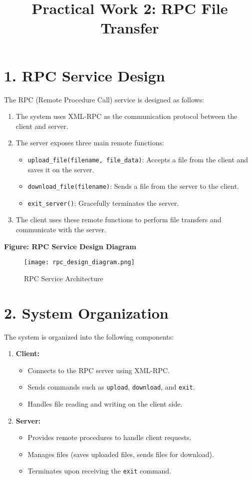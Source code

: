 \documentclass[a4paper,12pt]{article}
\title{Practical Work 2: RPC File Transfer}
\author{}
\date{}
\begin{document}
\maketitle

\section*{1. RPC Service Design}
The RPC (Remote Procedure Call) service is designed as follows:
\begin{enumerate}
    \item The system uses XML-RPC as the communication protocol between the client and server.
    \item The server exposes three main remote functions:
    \begin{itemize}
        \item \texttt{upload\_file(filename, file\_data)}: Accepts a file from the client and saves it on the server.
        \item \texttt{download\_file(filename)}: Sends a file from the server to the client.
        \item \texttt{exit\_server()}: Gracefully terminates the server.
    \end{itemize}
    \item The client uses these remote functions to perform file transfers and communicate with the server.
\end{enumerate}

\noindent \textbf{Figure: RPC Service Design Diagram}
\begin{figure}[h!]
    \centering
    \texttt{[image: rpc\_design\_diagram.png]} %
    \caption{RPC Service Architecture}
\end{figure}

\section*{2. System Organization}
The system is organized into the following components:
\begin{enumerate}
    \item \textbf{Client:}
    \begin{itemize}
        \item Connects to the RPC server using XML-RPC.
        \item Sends commands such as \texttt{upload}, \texttt{download}, and \texttt{exit}.
        \item Handles file reading and writing on the client side.
    \end{itemize}
    \item \textbf{Server:}
    \begin{itemize}
        \item Provides remote procedures to handle client requests.
        \item Manages files (saves uploaded files, sends files for download).
        \item Terminates upon receiving the \texttt{exit} command.
    \end{itemize}
\end{enumerate}
\end{document}
